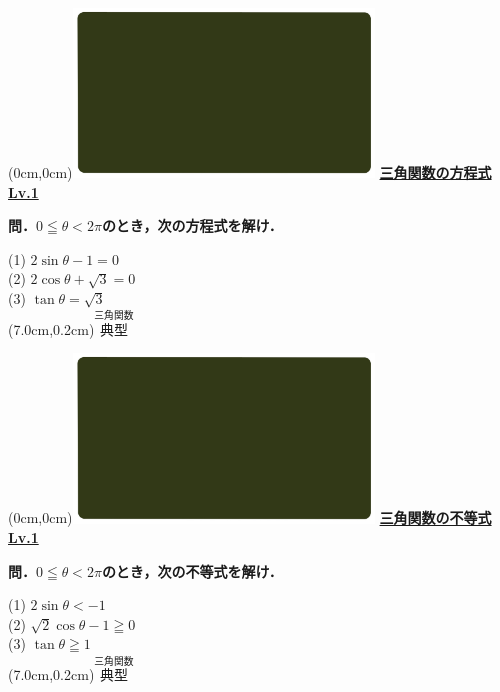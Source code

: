 \documentclass[10pt,
fleqn,
dvipdfmx,
uplatex
]{jsarticle}
\begin{document}
\at(0cm,0cm){\includegraphics[width=8cm,bb=0 0 1920 1080]{./youtube/thumbnails/templates/smart_background/三角関数.jpeg}}
{\color{orange}\bf\boldmath\LARGE\underline{三角関数の方程式 Lv.1}}\vspace{0.3zw}

\normalsize
\bf\boldmath 問．$0\leqq \theta <2\pi$のとき，次の方程式を解け．

\LARGE
(1)  $2\sin \theta -1=0$\\
(2)  $2\cos \theta +\sqrt 3=0$\\
(3)  $\tan \theta =\sqrt 3$\\

\at(7.0cm,0.2cm){\small\color{bradorange}$\overset{\text{三角関数}}{\text{典型}}$}


\newpage



\at(0cm,0cm){\includegraphics[width=8cm,bb=0 0 1920 1080]{./youtube/thumbnails/templates/smart_background/三角関数.jpeg}}
{\color{orange}\bf\boldmath\LARGE\underline{三角関数の不等式 Lv.1}}\vspace{0.3zw}

\normalsize
\bf\boldmath 問．$0\leqq \theta <2\pi$のとき，次の不等式を解け．

\LARGE
\vspace{-0.1zw}
(1)  $2\sin \theta <-1$\\
(2)  $\sqrt 2\cos \theta -1\geqq 0$\\
(3)  $\tan \theta \geqq 1$\\

\at(7.0cm,0.2cm){\small\color{bradorange}$\overset{\text{三角関数}}{\text{典型}}$}
\end{document}
